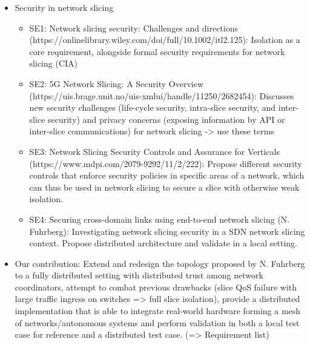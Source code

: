 \begin{itemize}
\begin{itemize}
    \end{itemize}
    \item Security in network slicing
    \begin{itemize}
        \item SE1: Network slicing security: Challenges and directions (https://onlinelibrary.wiley.com/doi/full/10.1002/itl2.125): Isolation as a core requirement, alongside formal security requirements for network slicing (CIA)
        \item SE2: 5G Network Slicing: A Security Overview (https://uis.brage.unit.no/uis-xmlui/handle/11250/2682454): Discusses new security challenges (life-cycle security, intra-slice security, and inter-slice security) and privacy concerns (exposing information by API or inter-slice communications) for network slicing -> use these terms
        \item SE3: Network Slicing Security Controls and Assurance for Verticals (https://www.mdpi.com/2079-9292/11/2/222): Propose different security controls that enforce security policies in specific areas of a network, which can thus be used in network slicing to secure a slice with otherwise weak isolation.
        \item SE4: Securing cross-domain links using end-to-end network slicing (N. Fuhrberg): Investigating network slicing security in a SDN network slicing context. Propose distributed architecture and validate in a local setting.
    \end{itemize}
    \item Our contribution: Extend and redesign the topology proposed by N. Fuhrberg to a fully distributed setting with distributed trust among network coordinators, attempt to combat previous drawbacks (slice QoS failure with large traffic ingress on switches => full slice isolation), provide a distributed implementation that is able to integrate real-world hardware forming a mesh of networks/autonomous systems and perform validation in both a local test case for reference and a distributed test case. (=> Requirement list)
\end{itemize}
\fi


